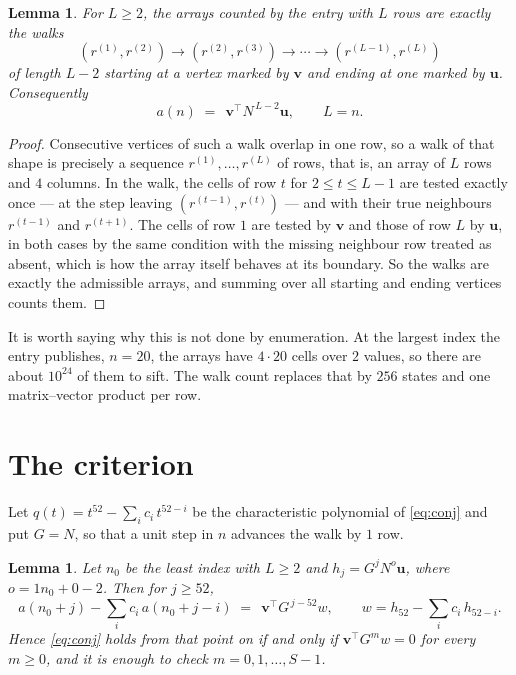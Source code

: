 \documentclass[11pt,a4paper]{article}
\theoremstyle{plain}
\newtheorem{lemma}[theorem]{Lemma}
\theoremstyle{definition}
\begin{document}
\begin{lemma}\label{lem:walk}
For $L\ge2$, the arrays counted by the entry with $L$ rows are exactly the walks
\[
(r^{(1)},r^{(2)})\to(r^{(2)},r^{(3)})\to\cdots\to(r^{(L-1)},r^{(L)})
\]
of length $L-2$ starting at a vertex marked by $\mathbf{v}$ and ending at one marked by
$\mathbf{u}$. Consequently
\[
a(n)\;=\;\,\mathbf{v}^{\!\top}N^{\,L-2}\mathbf{u},\qquad L=n .
\]
\end{lemma}

\begin{proof}
Consecutive vertices of such a walk overlap in one row, so a walk of that shape is
precisely a sequence $r^{(1)},\dots,r^{(L)}$ of rows, that is, an array of $L$ rows
and $4$ columns. In the walk, the cells of row $t$ for $2\le t\le L-1$ are tested
exactly once --- at the step leaving $(r^{(t-1)},r^{(t)})$ --- and with their true
neighbours $r^{(t-1)}$ and $r^{(t+1)}$. The cells of row $1$ are tested by
$\mathbf{v}$ and those of row $L$ by $\mathbf{u}$, in both cases by the same condition
with the missing neighbour row treated as absent, which is how the array itself behaves at
its boundary. So the walks are exactly the admissible arrays, and summing over all starting
and ending vertices counts them.
\end{proof}


It is worth saying why this is not done by enumeration. At the largest index the entry
publishes, $n=20$, the arrays have $4\cdot20$ cells over
$2$ values, so there are about $10^{24}$ of them to sift. The
walk count replaces that by $256$ states and one matrix--vector product per row.
\section{The criterion}

Let $q(t)=t^{52}-\sum_i c_i\,t^{52-i}$ be the characteristic polynomial of
\eqref{eq:conj} and put $G=N$, so that a unit step in $n$ advances the walk by
$1$ row.

\begin{lemma}\label{lem:crit}
Let $n_0$ be the least index with $L\ge2$ and $h_j=G^{j}N^{o}\mathbf{u}$, where
$o=1n_0+0-2$. Then for $j\ge52$,
\[
a(n_0+j)-\sum_i c_i\,a(n_0+j-i)\;=\;\,\mathbf{v}^{\!\top}G^{\,j-52}w,
\qquad w=h_{52}-\sum_i c_i\,h_{52-i} .
\]
Hence \eqref{eq:conj} holds from that point on if and only if
$\mathbf{v}^{\!\top}G^{m}w=0$ for every $m\ge0$, and it is enough to check
$m=0,1,\dots,S-1$.
\end{lemma}
\end{document}
